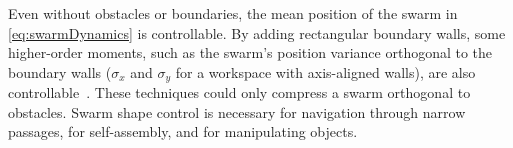 Even without obstacles or boundaries, the mean position of the swarm in \eqref{eq:swarmDynamics} is controllable.  By adding rectangular boundary walls, some higher-order moments, such as the swarm's position variance orthogonal to the boundary walls ($\sigma_x$ and $\sigma_y$ for a workspace with axis-aligned walls), are also controllable~\citep{ShahrokhiIROS2015}. 
These techniques could only compress a swarm orthogonal to obstacles.
Swarm shape control is necessary for navigation through narrow passages, for self-assembly, and for manipulating objects.




